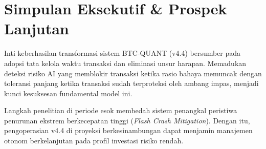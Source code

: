 \documentclass[a4paper,11pt]{article}
\begin{document}
\section{Simpulan Eksekutif \& Prospek Lanjutan}
Inti keberhasilan transformasi sistem BTC-QUANT (v4.4) bersumber pada adopsi tata kelola waktu transaksi dan eliminasi unsur harapan. Memadukan deteksi risiko AI yang memblokir transaksi ketika rasio bahaya memuncak dengan toleransi panjang ketika transaksi sudah terproteksi oleh ambang impas, menjadi kunci kesuksesan fundamental model ini.

Langkah penelitian di periode esok membedah sistem penangkal peristiwa penurunan ekstrem berkecepatan tinggi (\textit{Flash Crash Mitigation}). Dengan itu, pengoperasian v4.4 di proyeksi berkesinambungan dapat menjamin manajemen otonom berkelanjutan pada profil investasi risiko rendah.
\end{document}
